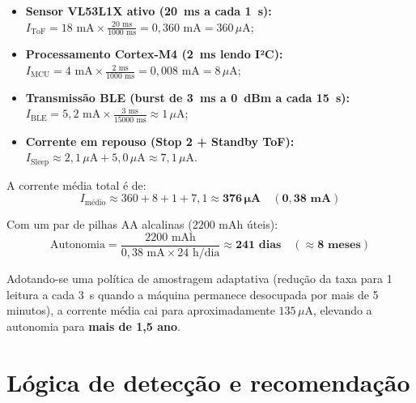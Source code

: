 \documentclass[11pt,a4paper]{article}
\begin{document}
\begin{itemize}
  \item \textbf{Sensor VL53L1X ativo (20~ms a cada 1~s):}
        $I_{\text{ToF}} = 18\text{ mA} \times \frac{20\text{ ms}}{1000\text{ ms}} = 0{,}360\text{ mA} = 360\,\mu\text{A}$;
  \item \textbf{Processamento Cortex-M4 (2~ms lendo I²C):}
        $I_{\text{MCU}} = 4\text{ mA} \times \frac{2\text{ ms}}{1000\text{ ms}} = 0{,}008\text{ mA} = 8\,\mu\text{A}$;
  \item \textbf{Transmissão BLE (burst de 3~ms a 0~dBm a cada 15~s):}\\
        $I_{\text{BLE}} = 5{,}2\text{ mA} \times \frac{3\text{ ms}}{15000\text{ ms}} \approx 1\,\mu\text{A}$;
  \item \textbf{Corrente em repouso (Stop 2 + Standby ToF):}
        $I_{\text{Sleep}} \approx 2{,}1\,\mu\text{A} + 5{,}0\,\mu\text{A} \approx 7{,}1\,\mu\text{A}$.
\end{itemize}

A corrente média total é de:
\begin{equation}
I_{\text{médio}} \approx 360 + 8 + 1 + 7{,}1 \approx \mathbf{376\,\mu\text{A} \quad (0{,}38\text{ mA})}
\end{equation}

Com um par de pilhas AA alcalinas ($2200\text{ mAh}$ úteis):
\begin{equation}
\text{Autonomia} = \frac{2200\text{ mAh}}{0{,}38\text{ mA} \times 24\text{ h/dia}} \approx \mathbf{241\text{ dias} \quad (\approx 8\text{ meses})}
\end{equation}

Adotando-se uma política de amostragem adaptativa (redução da taxa para 1 leitura a cada 3~s
quando a máquina permanece desocupada por mais de 5 minutos), a corrente média cai para
aproximadamente $135\,\mu\text{A}$, elevando a autonomia para \textbf{mais de 1,5 ano}.

\section{Lógica de detecção e recomendação}
\end{document}

